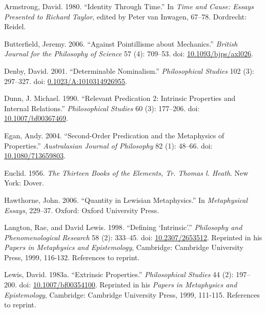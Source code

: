 \documentclass[
  11pt,
  letterpaper,
  DIV=11,
  numbers=noendperiod,
  twoside]{scrartcl}
\newlength{\cslhangindent}
\newenvironment{CSLReferences}[2] %
 {\begin{list}{}{%
  \setlength{\itemindent}{0pt}
  \setlength{\leftmargin}{0pt}
  \setlength{\parsep}{0pt}
  \ifodd #1
   \setlength{\leftmargin}{\cslhangindent}
   \setlength{\itemindent}{-1\cslhangindent}
  \fi
  \setlength{\itemsep}{#2\baselineskip}}}
 {\end{list}}
\begin{document}
\label{refs}
\begin{CSLReferences}{1}{0}
Armstrong, David. 1980. {``Identity Through Time.''} In \emph{Time and
Cause: Essays Presented to Richard Taylor}, edited by Peter van Inwagen,
67--78. Dordrecht: Reidel.

Butterfield, Jeremy. 2006. {``Against Pointillisme about Mechanics.''}
\emph{British Journal for the Philosophy of Science} 57 (4): 709--53.
doi: \href{https://doi.org/10.1093/bjps/axl026}{10.1093/bjps/axl026}.

Denby, David. 2001. {``Determinable Nominalism.''} \emph{Philosophical
Studies} 102 (3): 297--327. doi:
\href{https://doi.org/0.1023/A:1010314926955}{0.1023/A:1010314926955}.

Dunn, J. Michael. 1990. {``Relevant Predication 2: Intrinsic Properties
and Internal Relations.''} \emph{Philosophical Studies} 60 (3):
177--206. doi:
\href{https://doi.org/10.1007/bf00367469}{10.1007/bf00367469}.

Egan, Andy. 2004. {``Second-Order Predication and the Metaphysics of
Properties.''} \emph{Australasian Journal of Philosophy} 82 (1): 48--66.
doi: \href{https://doi.org/10.1080/713659803}{10.1080/713659803}.

Euclid. 1956. \emph{The Thirteen Books of the Elements, {Tr. Thomas l.
Heath}}. New York: Dover.

Hawthorne, John. 2006. {``Quantity in Lewisian Metaphysics.''} In
\emph{Metaphysical Essays}, 229--37. Oxford: Oxford University Press.

Langton, Rae, and David Lewis. 1998. {``Defining {`Intrinsic'}.''}
\emph{Philosophy and Phenomenological Research} 58 (2): 333--45. doi:
\href{https://doi.org/10.2307/2653512}{10.2307/2653512}. Reprinted in
his \emph{Papers in Metaphysics and Epistemology}, Cambridge: Cambridge
University Press, 1999, 116-132. References to reprint.

Lewis, David. 1983a. {``Extrinsic Properties.''} \emph{Philosophical
Studies} 44 (2): 197--200. doi:
\href{https://doi.org/10.1007/bf00354100}{10.1007/bf00354100}. Reprinted
in his \emph{Papers in Metaphysics and Epistemology}, Cambridge:
Cambridge University Press, 1999, 111-115. References to reprint.


\end{CSLReferences}
\end{document}
